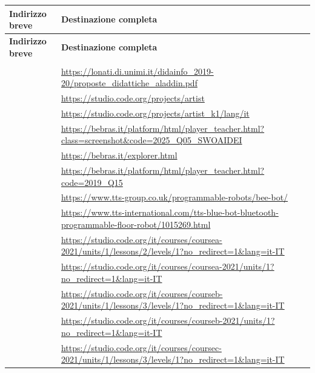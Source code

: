 \begingroup
\footnotesize
{}
\appto\UrlNoBreaks{\do\:}
\setlength{\tabcolsep}{5pt}
\renewcommand{\arraystretch}{1.15}
\begin{longtable}{@{}>{\raggedright\arraybackslash}p{}>{\raggedright\arraybackslash}p{}@{}}
\textbf{Indirizzo breve} & \textbf{Destinazione completa}\\
\hline
\endfirsthead
\textbf{Indirizzo breve} & \textbf{Destinazione completa}\\
\hline
\endhead
\hline
{}\\
\endfoot
\hline
\endlastfoot
{} & \url{https://lonati.di.unimi.it/didainfo_2019-20/proposte_didattiche_aladdin.pdf} \\[4pt]
 & \url{https://studio.code.org/projects/artist} \\[4pt]
 & \url{https://studio.code.org/projects/artist_k1/lang/it} \\[4pt]
 & \url{https://bebras.it/platform/html/player_teacher.html?class=screenshot&code=2025_Q05_SWOAIDEI} \\[4pt]
 & \url{https://bebras.it/explorer.html} \\[4pt]
 & \url{https://bebras.it/platform/html/player_teacher.html?code=2019_Q15} \\[4pt]
 & \url{https://www.tts-group.co.uk/programmable-robots/bee-bot/} \\[4pt]
 & \url{https://www.tts-international.com/tts-blue-bot-bluetooth-programmable-floor-robot/1015269.html} \\[4pt]
 & \url{https://studio.code.org/it/courses/coursea-2021/units/1/lessons/2/levels/1?no_redirect=1&lang=it-IT} \\[4pt]
 & \url{https://studio.code.org/it/courses/coursea-2021/units/1?no_redirect=1&lang=it-IT} \\[4pt]
 & \url{https://studio.code.org/it/courses/courseb-2021/units/1/lessons/3/levels/1?no_redirect=1&lang=it-IT} \\[4pt]
 & \url{https://studio.code.org/it/courses/courseb-2021/units/1?no_redirect=1&lang=it-IT} \\[4pt]
 & \url{https://studio.code.org/it/courses/coursec-2021/units/1/lessons/3/levels/1?no_redirect=1&lang=it-IT} \\[4pt]

\end{longtable}
